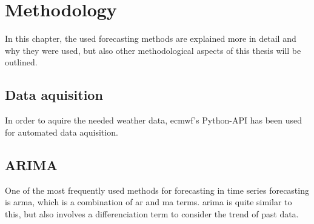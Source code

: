 \chapter{Methodology}
\label{ch:methods}

In this chapter, the used forecasting methods are explained more in detail and why they were used, but also other methodological aspects of this thesis will be outlined.\\


\section{Data aquisition}

In order to aquire the needed weather data, \gls{ecmwf}'s Python-API has been used for automated data aquisition.\\

\section{ARIMA}

One of the most frequently used methods for forecasting in time series forecasting is \gls{arma}, which is a combination of \gls{ar} and \gls{ma} terms. \gls{arima} is quite similar to this, but also involves a differenciation term to consider the trend of past data.\\





%
%
%

